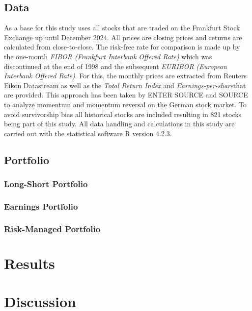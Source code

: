 \documentclass[12pt]{article}
\begin{document}
\subsection{Data} \label{subsection:Data}
As a base for this study uses all stocks that are traded on the Frankfurt Stock Exchange up until December 2024. All prices are closing prices and returns are calculated from close-to-close. The risk-free rate for comparison is made up by the one-month \textit{FIBOR (Frankfurt Interbank Offered Rate)} which was discontinued at the end of 1998 and the subsequent \textit{EURIBOR (European Interbank Offered Rate)}. For this, the monthly prices are extracted from Reuters Eikon Datastream as well as the \textit{Total Return Index} and \textit{Earnings-per-share}that are provided. This approach has been taken by ENTER SOURCE and SOURCE to analyze momentum and momentum reversal on the German stock market. To avoid survivorship bias all historical stocks are included resulting in 821 stocks being part of this study. All data handling and calculations in this study are carried out with the statistical software R version 4.2.3. 


\subsection{Portfolio} \label{subsection:Portfolio}

\subsubsection{Long-Short Portfolio} \label{subsubsection:LS_portfolio}

\subsubsection{Earnings Portfolio} \label{subsubsection:EP}

\subsubsection{Risk-Managed Portfolio} \label{subsubsection:rmport}


\section{Results} \label{section:Results}

\section{Discussion} \label{section:Discussion}
\end{document}
